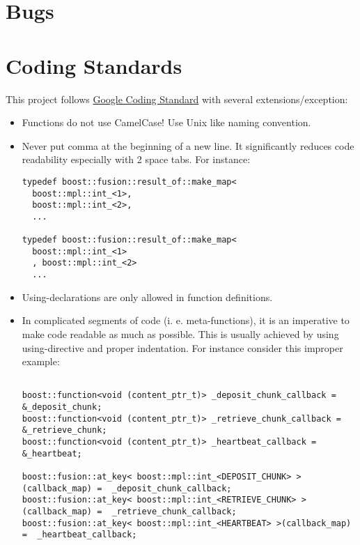 \documentclass{article}
\begin{document}
\tableofcontents

\newpage

\section{Bugs}

\section{Coding Standards}

This project follows \href{http://google-styleguide.googlecode.com/svn/trunk/cppguide.xml}{Google Coding Standard} with several extensions/exception:

\begin{itemize}
\item Functions do not use CamelCase! Use Unix like naming convention.

\item Never put comma at the beginning of a new line. It significantly reduces code readability especially with 2 space tabs. For instance: 

\begin{lstlisting}
typedef boost::fusion::result_of::make_map<
  boost::mpl::int_<1>, 
  boost::mpl::int_<2>,
  ...

typedef boost::fusion::result_of::make_map<
  boost::mpl::int_<1>
  , boost::mpl::int_<2>
  ...
\end{lstlisting}

\item Using-declarations are only allowed in function definitions.

\item In complicated segments of code (i. e. meta-functions), it is an imperative to make code readable as much as possible. This is usually achieved by using using-directive and proper indentation. For instance consider this improper example: 

\begin{lstlisting}

boost::function<void (content_ptr_t)> _deposit_chunk_callback = &_deposit_chunk;
boost::function<void (content_ptr_t)> _retrieve_chunk_callback = &_retrieve_chunk;
boost::function<void (content_ptr_t)> _heartbeat_callback = &_heartbeat;

boost::fusion::at_key< boost::mpl::int_<DEPOSIT_CHUNK> >(callback_map) =  _deposit_chunk_callback;
boost::fusion::at_key< boost::mpl::int_<RETRIEVE_CHUNK> >(callback_map) =  _retrieve_chunk_callback;
boost::fusion::at_key< boost::mpl::int_<HEARTBEAT> >(callback_map) =  _heartbeat_callback;


\end{lstlisting}
\end{itemize}
\end{document}
